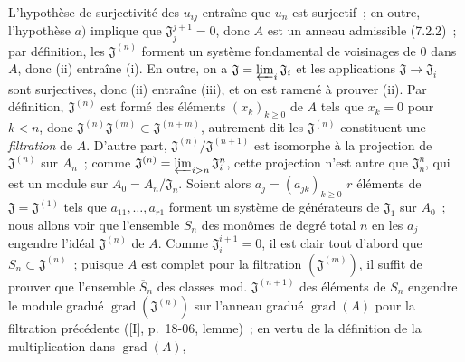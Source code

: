 L'hypothèse de surjectivité des $u_{ij}$ entraîne que $u_n$ est surjectif~;
en outre, l'hypothèse $a)$ implique que $\mathfrak J_j^{j+1}=0$, donc $A$ est
un anneau admissible (7.2.2)~; par définition, les $\mathfrak J^{(n)}$ forment
un système fondamental de voisinages de $0$ dans $A$, donc (ii) entraîne (i).
En outre, on a $\mathfrak J=\varprojlim_i\mathfrak J_i$ et les applications
$\mathfrak J\to\mathfrak J_i$ sont surjectives, donc (ii) entraîne (iii), et
on est ramené à prouver (ii). Par définition, $\mathfrak J^{(n)}$ est formé
des éléments $(x_k)_{k\geq0}$ de $A$ tels que $x_k=0$ pour $k<n$, donc
$\mathfrak J^{(n)}\mathfrak J^{(m)}\subset\mathfrak J^{(n+m)}$, autrement dit
les $\mathfrak J^{(n)}$ constituent une \emph{filtration} de $A$. D'autre
part, $\mathfrak J^{(n)}/\mathfrak J^{(n+1)}$ est isomorphe à la projection de
$\mathfrak J^{(n)}$ sur $A_n$~; comme
$\mathfrak J^{(n)}=\varprojlim_{i>n}\mathfrak J_i^n$, cette projection n'est
autre que $\mathfrak J_n^n$, qui est un module sur
$A_0=A_n/\mathfrak J_n$. Soient alors $a_j=(a_{jk})_{k\geq0}$ $r$ éléments de
$\mathfrak J=\mathfrak J^{(1)}$ tels que $a_{11},\ldots,a_{r1}$ forment un
système de générateurs de $\mathfrak J_1$ sur $A_0$~; nous allons voir que
l'ensemble $S_n$ des monômes de degré total $n$ en les $a_j$ engendre l'idéal
$\mathfrak J^{(n)}$ de $A$. Comme $\mathfrak J_i^{i+1}=0$, il est clair tout
d'abord que $S_n\subset\mathfrak J^{(n)}$~; puisque $A$ est complet pour la
filtration $(\mathfrak J^{(m)})$, il suffit de prouver que l'ensemble
$\overline S_n$ des classes mod. $\mathfrak J^{(n+1)}$ des éléments de $S_n$
engendre le module gradué $\operatorname{grad}(\mathfrak J^{(n)})$ sur
l'anneau gradué $\operatorname{grad}(A)$ pour la filtration précédente
([I], p.~18-06, lemme)~; en vertu de la définition de la multiplication dans
$\operatorname{grad}(A)$,

